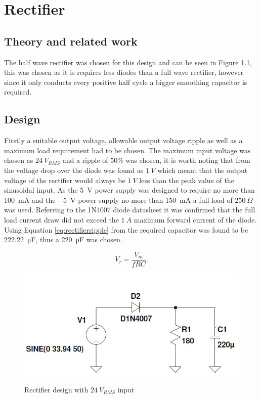 \chapter{Rectifier}
\section{Theory and related work} \label{sec:literature_rectifier}
The half wave rectifier was chosen for this design and can be seen in Figure \ref{fig:rectifierdiagram}, this was chosen as it is requires less diodes than a full wave rectifier, however since it only conducts every positive half cycle a bigger smoothing capacitor is required.


\section{Design} \label{sec:design_rectifier}
Firstly a suitable output voltage, allowable output voltage ripple as well as a maximum load requirement had to be chosen. The maximum input voltage was chosen as $\SI{24}{V_{RMS}}$ and a ripple of $50\%$ was chosen, it is worth noting that from \cite{1n4007:2011} the voltage drop over the diode was found as $\SI{1}{V}$ which meant that the output voltage of the rectifier would always be $\SI{1}{V}$ less than the peak value of the sinusoidal input. As the \SI{5}{V} power supply was designed to require no more than \SI{100}{\milli A} and the \SI{-5}{V} power supply no more than \SI{150}{\milli A} a full load of $\SI{250}{\Omega}$ was used. Referring to the 1N4007 diode datasheet it was confirmed that the full load current draw did not exceed the $\SI{1}{A}$ maximum forward current of the diode. Using Equation \ref{eq:rectifierripple} from \cite{Neaman:2018} the required capacitor was found to be \SI{222.22}{\micro F}, thus a \SI{220}{\micro F} was chosen.

\begin{equation}
   V_{r} = \frac{V_{m}}{fRC}
   \label{eq:rectifierripple}. 
\end{equation}

\begin{figure}
    \centering
    \includegraphics[width = 0.4\linewidth]{Figures/rectifier.jpg}
    \caption{Rectifier design with $\SI{24}{V_{RMS}}$ input}
    \label{fig:rectifierdiagram}
\end{figure}

